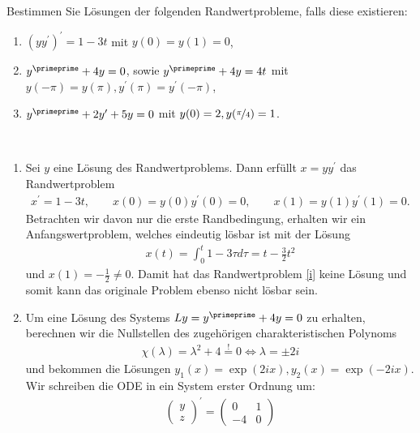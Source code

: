 \begin{exercise}
Bestimmen Sie Lösungen der folgenden Randwertprobleme, falls diese existieren:
\begin{enumerate}[label = \textbf{\alph*)}]
  \item $(yy^{\prime})^{\prime} = 1 - 3t$ mit $y(0) = y(1) = 0$,
  \item $y^{\primeprime} + 4y = 0$, sowie $y^{\primeprime} + 4y = 4t$ mit
  $y(-\pi) = y(\pi), y^{\prime}(\pi) = y^{\prime}(-\pi)$,
  \item $y^{\primeprime} + 2y^{\prime} + 5y = 0$ mit $y(0) = 2, y(\nicefrac{\pi}{4}) = 1$.
\end{enumerate}
\end{exercise}
\begin{solution}
\leavevmode \\
\begin{enumerate}[label = \textbf{\alph*)}]
  \item Sei $y$ eine Lösung des Randwertproblems. Dann erfüllt
  $x = yy^{\prime}$ das Randwertproblem
  \begin{align}\label{i}
    x^{\prime} = 1 - 3t, \qquad x(0) = y(0)y^{\prime}(0) = 0, \qquad x(1) = y(1)y^{\prime}(1) = 0.
  \end{align}
  Betrachten wir davon nur die erste Randbedingung, erhalten wir ein Anfangswertproblem,
  welches eindeutig lösbar ist mit der Lösung
  \begin{align*}
    x(t) = \int_0^t 1 -3\tau d\tau = t - \frac{3}{2}t^2
  \end{align*}
  und $x(1) = -\frac{1}{2} \neq 0$. Damit hat das Randwertproblem \eqref{i}
  keine Lösung und somit kann das originale Problem ebenso nicht lösbar sein.
  \item Um eine Lösung des Systems $Ly = y^{\primeprime} + 4y = 0$
  zu erhalten, berechnen wir die Nullstellen des zugehörigen charakteristischen Polynoms
  \begin{align*}
    \chi(\lambda) = \lambda^2 + 4 \stackrel{!}{=} 0 \iff \lambda = \pm2i
  \end{align*}
  und bekommen die Lösungen $y_1(x) = \exp(2ix), y_2(x) = \exp(-2ix)$.
  Wir schreiben die ODE in ein System erster Ordnung um:
  \begin{align*}
    \begin{pmatrix}
      y \\ z
    \end{pmatrix}^{\prime} =
    \begin{pmatrix}
      0 & 1 \\ -4 & 0

\end{pmatrix}
\end{align*}
\end{enumerate}
\end{solution}
